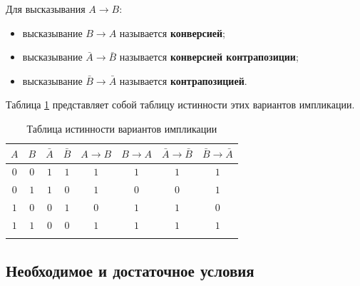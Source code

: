 \documentclass[a5paper, 11pt]{extarticle}
\theoremstyle{definition}
\theoremstyle{definition}
\theoremstyle{definition}
\numberwithin{figure}{section}
\numberwithin{table}{section}
\begin{document}
Для высказывания \(A \to B\):
\begin{itemize}
    \item высказывание \(B \to A\) называется \textbf{конверсией};
    \item высказывание \(\bar{A} \to \bar{B}\) называется \textbf{конверсией контрапозиции};
    \item высказывание \(\bar{B} \to \bar{A}\) называется \textbf{контрапозицией}.
\end{itemize}

Таблица \ref{tab:truth-table-implication} представляет собой таблицу истинности этих вариантов импликации.

{
\renewcommand*{\arraystretch}{1.5}
\begin{longtable}{|c|c|c|c|c|c|c|c|}
    \hline
    \(A\) & \(B\) & \(\bar{A}\) & \(\bar{B}\) & \(A \to B\) & \(B \to A\) & \(\bar{A} \to \bar{B}\) & \(\bar{B} \to \bar{A}\) \\
    \hline
    \(0\) & \(0\) & \(1\)       & \(1\)       & \(1\)       & \(1\)       & \(1\)                   & \(1\)                   \\
    \hline
    \(0\) & \(1\) & \(1\)       & \(0\)       & \(1\)       & \(0\)       & \(0\)                   & \(1\)                   \\
    \hline
    \(1\) & \(0\) & \(0\)       & \(1\)       & \(0\)       & \(1\)       & \(1\)                   & \(0\)                   \\
    \hline
    \(1\) & \(1\) & \(0\)       & \(0\)       & \(1\)       & \(1\)       & \(1\)                   & \(1\)                   \\
    \hline
    \caption{Таблица истинности вариантов импликации}
    \label{tab:truth-table-implication}
\end{longtable}
}

\subsection{Необходимое и достаточное условия}
\end{document}
